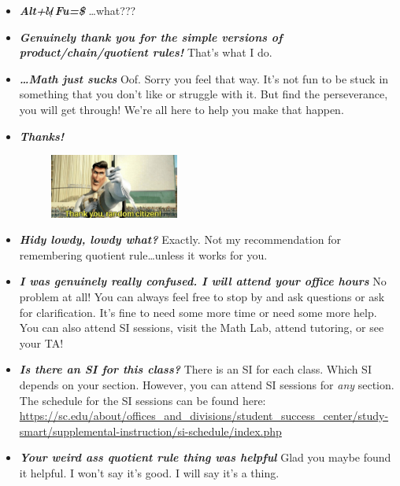 \documentclass[11pt,letterpaper]{article}
\begin{document}
\begin{itemize}
\item {\bfseries\itshape Alt+$\mathrlap{\text{\textbackslash}}{\mathcal{U}}$Fu=\$} \dots what???

\item {\bfseries\itshape Genuinely thank you for the simple versions of product/chain/quotient rules!} That's what I do.

\item {\bfseries\itshape \dots Math just sucks} Oof. Sorry you feel that way. It's not fun to be stuck in something that you don't like or struggle with it. But find the perseverance, you will get through! We're all here to help you make that happen. 

\newpage

\item {\bfseries\itshape Thanks!}
	\begin{figure}[H]
	\centering
	\includegraphics[width=0.40\textwidth]{images/citizen.jpeg}
	\end{figure}

\item {\bfseries\itshape Hidy lowdy, lowdy what?} Exactly. Not my recommendation for remembering quotient rule\dots unless it works for you. 

\item {\bfseries\itshape I was genuinely really confused. I will attend your office hours} No problem at all! You can always feel free to stop by and ask questions or ask for clarification. It's fine to need some more time or need some more help. You can also attend SI sessions, visit the Math Lab, attend tutoring, or see your TA!

\item {\bfseries\itshape Is there an SI for this class?} There is an SI for each class. Which SI depends on your section. However, you can attend SI sessions for \textit{any} section. The schedule for the SI sessions can be found here: \url{https://sc.edu/about/offices\_and\_divisions/student\_success\_center/study-smart/supplemental-instruction/si-schedule/index.php}

\item {\bfseries\itshape Your weird ass quotient rule thing was helpful} Glad you maybe found it helpful. I won't say it's good. I will say it's a thing.


\end{itemize}
\end{document}
